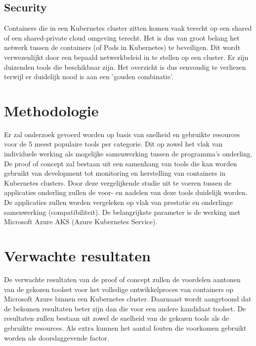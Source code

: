 \subsection{Security}
Containers die in een Kubernetes cluster zitten komen vaak terecht op een shared of een shared-private cloud omgeving terecht. Het is dus van groot belang het netwerk tussen de containers (of Pods in Kubernetes) te beveiligen. Dit wordt verwezenlijkt door een bepaald netwerkbeleid in te stellen op een cluster.
Er zijn duizenden tools die beschikbaar zijn. Het overzicht is dus eenvoudig te verliezen terwijl er duidelijk nood is aan een 'gouden combinatie'.

\section{Methodologie}
\label{sec:methodologie}

Er zal onderzoek gevoerd worden op basis van snelheid en gebruikte resources voor de 5 meest populaire tools per categorie. Dit op zowel het vlak van individuele werking als mogelijke samenwerking tussen de programma's onderling. De proof of concept zal bestaan uit een samenhang van tools die kan worden gebruikt van development tot monitoring en herstelling van containers in Kubernetes clusters. Door deze vergelijkende studie uit te voeren tussen de applicaties onderling zullen de voor- en nadelen van deze tools duidelijk worden. De applicaties zullen worden vergeleken op vlak van prestatie en onderlinge samenwerking (compatibiliteit). De belangrijkste parameter is de werking met Microsoft Azure AKS (Azure Kubernetes Service).


\section{Verwachte resultaten}
\label{sec:verwachte_resultaten}

De verwachte resultaten van de proof of concept zullen de voordelen aantonen van de gekozen toolset voor het volledige ontwikkelproces van containers op Microsoft Azure binnen een Kubernetes cluster. Daarnaast wordt aangetoond dat de bekomen resultaten beter zijn dan die voor een andere kandidaat toolset. De resultaten zullen bestaan uit zowel de snelheid van de gekozen tools als de gebruikte resources. Als extra kunnen het aantal fouten die voorkomen gebruikt worden als doorslaggevende factor.


